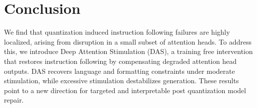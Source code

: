 \section{Conclusion}
\label{sec:conclusion}

We find that quantization induced instruction following failures are highly
localized, arising from disruption in a small subset of attention heads.
To address this, we introduce Deep Attention Stimulation (DAS), a training free
intervention that restores instruction following by compensating degraded
attention head outputs.
DAS recovers language and formatting constraints under moderate stimulation,
while excessive stimulation destabilizes generation.
These results point to a new direction for targeted and interpretable
post quantization model repair.

